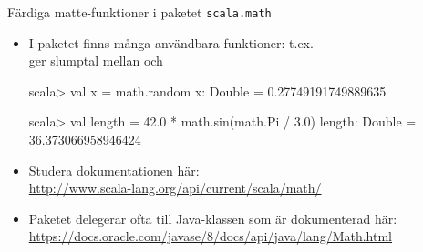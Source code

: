 \begin{Slide}{Färdiga matte-funktioner i paketet \texttt{scala.math}}\SlideFontSmall
\begin{itemize}
\item I paketet \texttt{} finns många användbara funktioner: t.ex.\\
 ger slumptal mellan  och 
\begin{REPLnonum}
scala> val x = math.random
x: Double = 0.27749191749889635

scala> val length = 42.0 * math.sin(math.Pi / 3.0)
length: Double = 36.373066958946424
\end{REPLnonum}

\item Studera dokumentationen här: \\{\SlideFontTiny
\url{http://www.scala-lang.org/api/current/scala/math/}}

\item Paketet  delegerar ofta till Java-klassen \texttt{} som är dokumenterad här: \\{\SlideFontTiny
\url{https://docs.oracle.com/javase/8/docs/api/java/lang/Math.html}}

\end{itemize}
\end{Slide}




